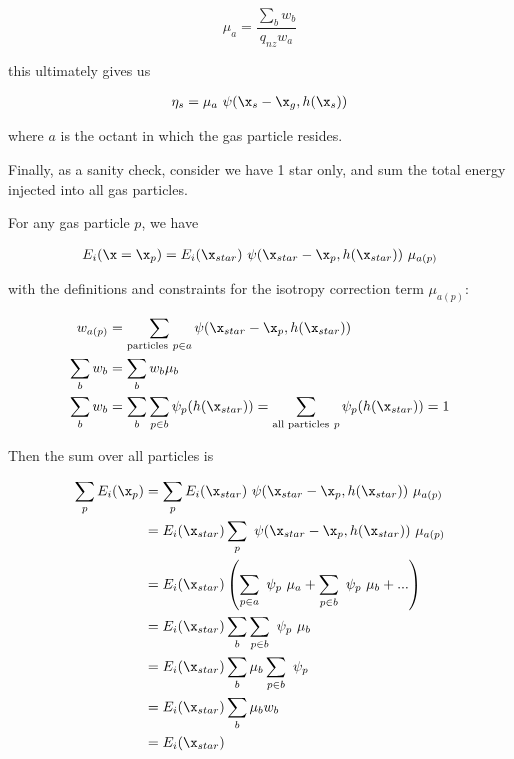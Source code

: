 \begin{equation}
	\mu_a = \frac{\sum_b w_b}{q_{nz} w_a} \label{eq:isotropy-correction-with-zero}
\end{equation}


this ultimately gives us

\begin{align}
    \eta_s = \mu_a \ \psi(\x_{s} - \x_{g}, h(\x_{s}))
\end{align}

where $a$ is the octant in which the gas particle resides.






Finally, as a sanity check, consider we have 1 star only, and sum the total energy injected into 
all gas particles.

For any gas particle $p$, we have

\begin{align}
    E_i (\x = \x_{p}) = E_i(\x_{star}) \ \psi(\x_{star} - \x_{p}, h(\x_{star})) \ \mu_{a(p)}
\end{align}

with the definitions and constraints for the isotropy correction term $\mu_{a(p)}$:

\begin{align}
    w_{a(p)} &= \sum_{\mathrm{particles}\ p \in a} \psi(\x_{star} - \x_{p},  h(\x_{star}))\\
    \sum_b w_b &= \sum_b w_b \mu_b\\
    \sum_b w_b &= \sum_b \sum_{p\in b} \psi_p(h(\x_{star})) = \sum_{\text{all particles}\ p} 
\psi_p (h(\x_{star})) = 1
\end{align}

Then the sum over all particles is

\begin{align}
    \sum_p E_i (\x_{p}) &= \sum_p E_i(\x_{star}) \ \psi(\x_{star} - \x_{p}, h(\x_{star})) \ 
\mu_{a(p)} \\
        &= E_i(\x_{star}) \sum_p \ \psi(\x_{star} - \x_{p}, h(\x_{star})) \ \mu_{a(p)} \\
        &= E_i(\x_{star}) \left( \sum_{p \in a} \ \psi_p \ \mu_{a} + \sum_{p \in b} \ \psi_p \ 
\mu_{b} + ... \right)\\
        &= E_i(\x_{star})  \sum_b \sum_{p \in b} \ \psi_p \ \mu_{b}\\
        &= E_i(\x_{star})  \sum_b \mu_{b} \sum_{p \in b} \ \psi_p \\
        &= E_i(\x_{star})  \sum_b \mu_{b} w_b \\
        &= E_i(\x_{star})
\end{align}










